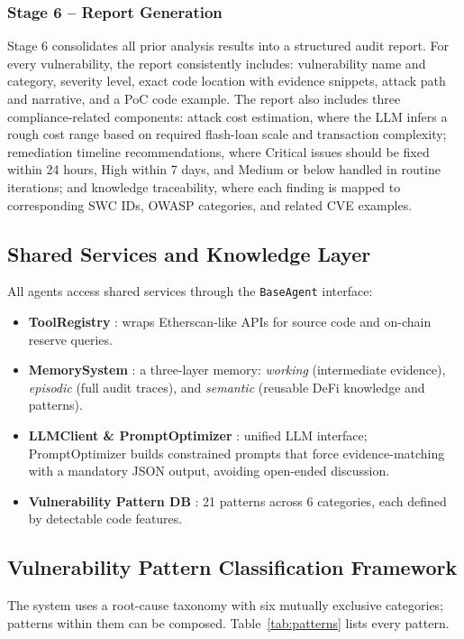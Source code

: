 \documentclass[10pt]{article}
\begin{document}
\subsubsection*{Stage 6 -- Report Generation}
Stage 6 consolidates all prior analysis results into a structured audit report. For every vulnerability, the report consistently includes: vulnerability name and category, severity level, exact code location with evidence snippets, attack path and narrative, and a PoC code example. The report also includes three compliance-related components: attack cost estimation, where the LLM infers a rough cost range based on required flash-loan scale and transaction complexity; remediation timeline recommendations, where Critical issues should be fixed within 24 hours, High within 7 days, and Medium or below handled in routine iterations; and knowledge traceability, where each finding is mapped to corresponding SWC IDs, OWASP categories, and related CVE examples.

\subsection{Shared Services and Knowledge Layer}
All agents access shared services through the \texttt{BaseAgent} interface:
\begin{itemize}
    \item \textbf{ToolRegistry} : wraps Etherscan-like APIs for source code and on-chain reserve queries.
    \item \textbf{MemorySystem} : a three-layer memory: \textit{working} (intermediate evidence), \textit{episodic} (full audit traces), and \textit{semantic} (reusable DeFi knowledge and patterns).
    \item \textbf{LLMClient \& PromptOptimizer} : unified LLM interface; PromptOptimizer builds constrained prompts that force evidence-matching with a mandatory JSON output, avoiding open-ended discussion.
    \item \textbf{Vulnerability Pattern DB} : 21 patterns across 6 categories, each defined by detectable code features.
\end{itemize}

\subsection{Vulnerability Pattern Classification Framework}
The system uses a root-cause taxonomy with six mutually exclusive categories; patterns within them can be composed. Table~\ref{tab:patterns} lists every pattern.
\end{document}
